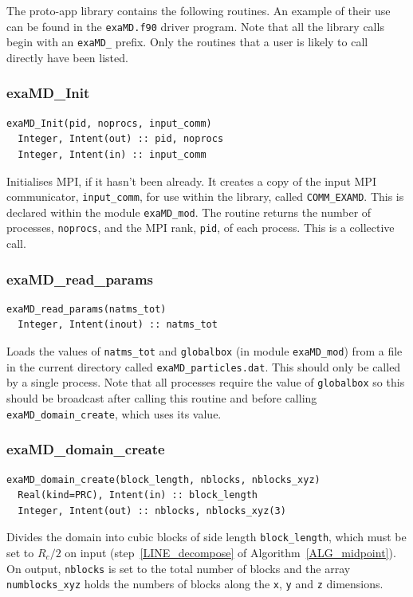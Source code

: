 \documentclass[paper=a4, fontsize=11pt,bibtotoc]{scrartcl}		%
\newcommand{\TT}[1]{\texttt{#1}}
\begin{document}
The proto-app library contains the following routines. An example of their use can be found in the \TT{exaMD.f90} driver program. Note that all the 
library calls begin with an \TT{exaMD\_} prefix. Only the routines that a user is likely to call directly have been listed.

\subsubsection{exaMD\_Init}

\begin{verbatim}
exaMD_Init(pid, noprocs, input_comm)
  Integer, Intent(out) :: pid, noprocs
  Integer, Intent(in) :: input_comm
\end{verbatim}
Initialises MPI, if it hasn't been already. It creates a copy of the input MPI communicator, \TT{input\_comm}, for use within the library, called 
\TT{COMM\_EXAMD}. This is declared within the module \TT{exaMD\_mod}. The routine returns the number of processes, \TT{noprocs}, and the MPI rank, 
\TT{pid}, of each process. This is a collective call.

\subsubsection{exaMD\_read\_params}

\begin{verbatim}
exaMD_read_params(natms_tot)
  Integer, Intent(inout) :: natms_tot
\end{verbatim}
Loads the values of \TT{natms\_tot} and \TT{globalbox} (in module \TT{exaMD\_mod}) from a file in the current directory called \TT{exaMD\_particles.dat}. This should only be called by a single process. Note that all processes require the value of \TT{globalbox} so this should be broadcast after calling this routine and before calling \TT{exaMD\_domain\_create}, which uses its value.

\subsubsection{exaMD\_domain\_create}

\begin{verbatim}
exaMD_domain_create(block_length, nblocks, nblocks_xyz)
  Real(kind=PRC), Intent(in) :: block_length
  Integer, Intent(out) :: nblocks, nblocks_xyz(3)
\end{verbatim}
Divides the domain into cubic blocks of side length \TT{block\_length}, which must be set to $R_c/2$ on input (step~\ref{LINE_decompose} of 
Algorithm~\ref{ALG_midpoint}). On output, \TT{nblocks} is set to the total number of blocks and the array \TT{numblocks\_xyz} holds the numbers of blocks along the \TT{x}, \TT{y} and \TT{z} dimensions. 
\end{document}

